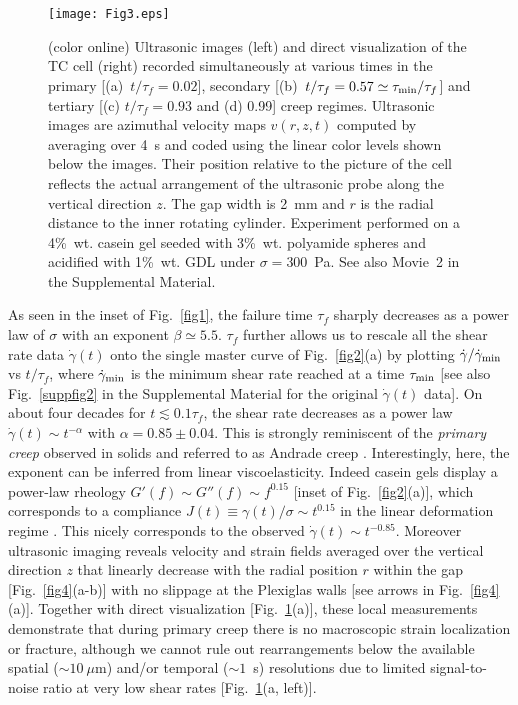 \documentclass[twocolumn,superscriptaddress,showpacs,preprintnumbers,amsmath,amssymb,prl]{revtex4}
\newcommand\gp{\dot\gamma}
\newcommand\taum{\tau_{\rm min}}
\begin{document}
\begin{figure}[t]
\centering
\texttt{[image: Fig3.eps]}
\caption{(color online) Ultrasonic images (left) and direct visualization of the TC cell (right) recorded simultaneously at various times in the primary [(a)~$t/\tau_f=0.02$], secondary [(b)~$t/\tau_f=0.57\simeq\taum/\tau_f$] and tertiary  [(c) $t/\tau_f=0.93$ and (d) 0.99] creep regimes. Ultrasonic images are azimuthal velocity maps $v(r,z,t)$ computed by averaging over 4~s and coded using the linear color levels shown below the images. Their position relative to the picture of the cell reflects the actual arrangement of the ultrasonic probe along the vertical direction $z$. The gap width is 2~mm and $r$ is the radial distance to the inner rotating cylinder. Experiment performed on a 4\%~wt. casein gel seeded with 3\%~wt. polyamide spheres and acidified with 1\%~wt. GDL under $\sigma=300$~Pa. See also Movie~2 in the Supplemental Material.
\label{fig3}}
\end{figure} 

As seen in the inset of Fig.~\ref{fig1}, the failure time $\tau_f$ sharply decreases as a power law of $\sigma$ with an exponent $\beta\simeq 5.5$. $\tau_f$ further allows us to rescale all the shear rate data $\gp(t)$ onto the single master curve of Fig.~\ref{fig2}(a) by plotting $\gp/\gp_{\rm min}$ vs $t/\tau_f$, where $\gp_{\rm min}$ is the minimum shear rate reached at a time $\tau_{\rm min}$ [see also Fig.~\ref{suppfig2} in the Supplemental Material for the original $\gp(t)$ data]. On about four decades for $t\lesssim 0.1\tau_f$, the shear rate decreases as a power law $\gp(t)\sim t^{-\alpha}$ with $\alpha=0.85\pm 0.04$. This is strongly reminiscent of the {\it primary creep} observed in solids and referred to as Andrade creep \cite{Andrade:1910,Miguel:2002,Nechad:2005,Rosti:2010}. Interestingly, here, the exponent can be inferred from linear viscoelasticity. Indeed casein gels display a power-law rheology $G'(f)\sim G''(f)\sim f^{0.15}$ [inset of Fig.~\ref{fig2}(a)], which corresponds to a compliance $J(t)\equiv\gamma(t)/\sigma\sim t^{0.15}$ in the linear deformation regime \cite{Tschoegl:1989}. This nicely corresponds to the observed $\gp(t)\sim t^{-0.85}$. Moreover ultrasonic imaging reveals velocity and strain fields averaged over the vertical direction $z$ that linearly decrease with the radial position $r$ within the gap [Fig.~\ref{fig4}(a-b)] with no slippage at the Plexiglas walls [see arrows in Fig.~\ref{fig4}(a)]. Together with direct visualization [Fig.~\ref{fig3}(a)], these local measurements demonstrate that during primary creep there is no macroscopic strain localization or fracture, although we cannot rule out rearrangements below the available spatial ($\sim10~\mu$m) and/or temporal ($\sim1$~s) resolutions due to limited signal-to-noise ratio at very low shear rates [Fig.~\ref{fig3}(a, left)].
\end{document}
